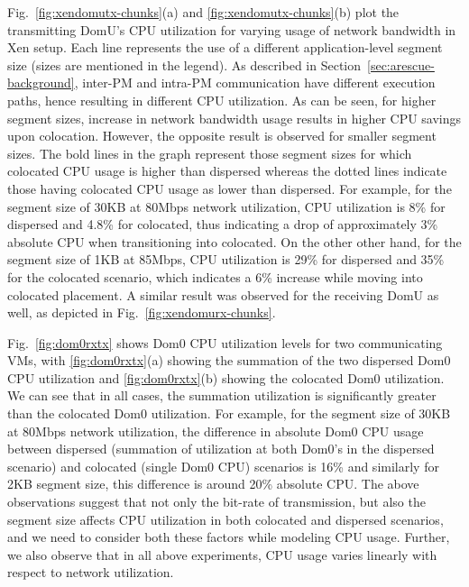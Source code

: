 Fig.~\ref{fig:xendomutx-chunks}(a) and \ref{fig:xendomutx-chunks}(b)
plot the transmitting DomU's CPU utilization for varying usage
of network bandwidth in Xen setup. Each line represents
the use of a different application-level segment size
(sizes are mentioned in the legend).
As described in Section~\ref{sec:arescue-background}, inter-PM and
intra-PM communication have different execution paths,
hence resulting in different CPU utilization.
As can be seen, for higher segment sizes, increase
in network bandwidth usage results in higher CPU savings upon
colocation. However, the opposite result is
observed for smaller segment sizes.
The bold lines in the graph represent those
segment sizes for which colocated CPU usage is higher than
dispersed whereas the dotted lines indicate those having
colocated CPU usage as lower than dispersed. For example,
for the segment size of 30KB at 80Mbps network utilization,
CPU utilization is 8\% for dispersed and 4.8\% for colocated,
thus indicating a drop of approximately 3\% absolute CPU
when transitioning into colocated. On the other other hand,
for the segment size of 1KB at 85Mbps, CPU utilization
is 29\% for dispersed and 35\% for the colocated scenario,
which indicates a 6\% increase while moving into colocated placement.
A similar result was observed for the receiving DomU as well,
as depicted in Fig.~\ref{fig:xendomurx-chunks}.

Fig.~\ref{fig:dom0rxtx} shows Dom0 CPU utilization
levels for two communicating VMs,
with
\ref{fig:dom0rxtx}(a)
showing the summation of the two dispersed Dom0 CPU utilization
and
\ref{fig:dom0rxtx}(b)
showing the colocated Dom0 utilization.
We can see that in all cases,
the summation utilization is significantly greater than the
colocated Dom0 utilization. For example,
for the segment size of 30KB at 80Mbps network utilization,
the difference in absolute Dom0 CPU usage between
dispersed (summation of utilization at both Dom0's in the
dispersed scenario) and colocated (single
Dom0 CPU) scenarios is 16\% and similarly for 2KB segment size,
this difference is around 20\% absolute CPU.
The above observations suggest that not only the bit-rate of
transmission, but also the segment size affects CPU utilization
in both colocated and dispersed scenarios, and we need to consider
both these factors while modeling CPU usage. Further, we also
observe that in all above experiments, CPU usage varies linearly
with respect to network utilization.



